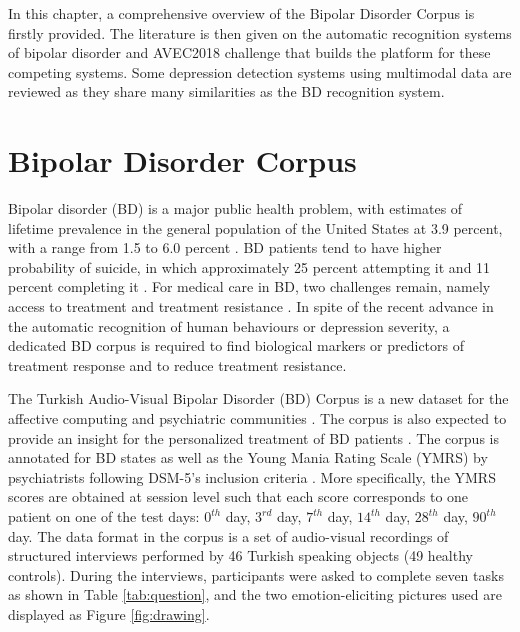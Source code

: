 
In this chapter, a comprehensive overview of the Bipolar Disorder Corpus is firstly provided. The literature is then given on the automatic recognition systems of bipolar disorder and AVEC2018 challenge that builds the platform for these competing systems. Some depression detection systems using multimodal data are reviewed as they share many similarities as the BD recognition system.



\section{Bipolar Disorder Corpus}
\label{sec:bp-corpus}

Bipolar disorder (BD) is a major public health problem, with estimates of lifetime prevalence in the general population of the United States at 3.9 percent, with a range from 1.5 to 6.0 percent \cite{world2017, hilty2006}. BD patients tend to have higher probability of suicide, in which approximately 25 percent attempting it and 11 percent completing it \cite{prien1990}. For medical care in BD, two challenges remain, namely access to treatment and treatment resistance \cite{bauer2017}. In spite of the recent advance in the automatic recognition of human behaviours or depression severity, a dedicated BD corpus is required to find biological markers or predictors of treatment response and to reduce treatment resistance. 

The Turkish Audio-Visual Bipolar Disorder (BD) Corpus is a new dataset for the affective computing and psychiatric communities \cite{cciftcci2018}. The corpus is also expected to provide an insight for the personalized treatment of BD patients \cite{cciftcci2018}. The corpus is annotated for BD states as well as the Young Mania Rating Scale (YMRS) by psychiatrists following DSM-5's inclusion criteria \cite{american2013}. More specifically, the YMRS scores are obtained at session level such that each score corresponds to one patient on one of the test days: $0^{th}$ day, $3^{rd}$ day, $7^{th}$ day, $14^{th}$ day, $28^{th}$ day, $90^{th}$ day. The data format in the corpus is a set of audio-visual recordings of structured interviews performed by 46 Turkish speaking objects (49 healthy controls). During the interviews, participants were asked to complete seven tasks as shown in Table \ref{tab:question}, and the two emotion-eliciting pictures used are displayed as Figure \ref{fig:drawing}.

